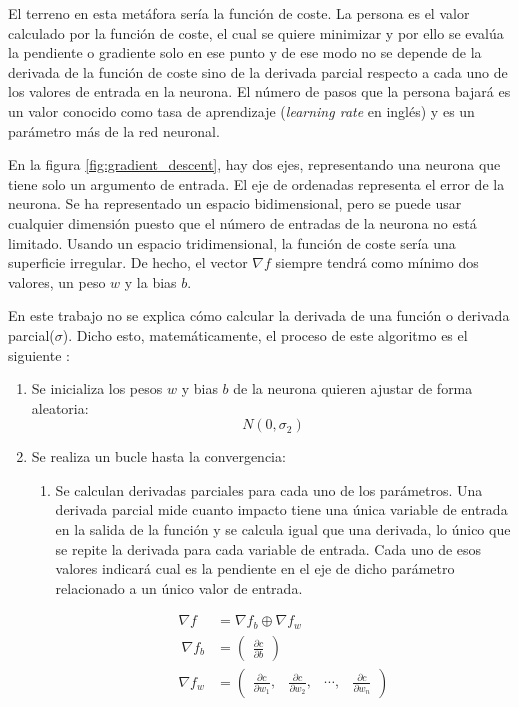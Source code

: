 \begin{itemize}
El terreno en esta metáfora sería la función de coste. La persona es el valor calculado por la función de coste, el cual se quiere minimizar y por ello se evalúa la pendiente o gradiente solo en ese punto y de ese modo no se depende de la derivada de la función de coste sino de la derivada parcial respecto a cada uno de los valores de entrada en la neurona. El número de pasos que la persona bajará es un valor conocido como tasa de aprendizaje (\textit{learning rate} en inglés) y es un parámetro más de la red neuronal. 
\newline


En la figura \ref{fig:gradient_descent}, hay dos ejes, representando una neurona que tiene solo un argumento de entrada. El eje de ordenadas representa el error de la neurona. Se ha representado un espacio bidimensional, pero se puede usar cualquier dimensión puesto que el número de entradas de la neurona no está limitado. Usando un espacio tridimensional, la función de coste sería una superficie irregular. De hecho, el vector $\nabla f$ siempre tendrá como mínimo dos valores, un peso $w$ y la bias $b$.
\newline

En este trabajo no se explica cómo calcular la derivada de una función o derivada parcial($\sigma$). Dicho esto, matemáticamente, el proceso de este algoritmo es el siguiente \cite{}:
\begin{enumerate}
\item Se inicializa los pesos $w$ y bias $b$ de la neurona quieren ajustar de forma aleatoria:
\begin{equation}
    ~N(0, \sigma_2)
\end{equation}

\item Se realiza un bucle hasta la convergencia:
\begin{enumerate}

\item Se calculan derivadas parciales para cada uno de los parámetros. Una derivada parcial mide cuanto impacto tiene una única variable de entrada en la salida de la función y se calcula igual que una derivada, lo único que se repite la derivada para cada variable de entrada. Cada uno de esos valores indicará cual es la pendiente en el eje de dicho parámetro relacionado a un único valor de entrada.

\begin{equation}
    \begin{split}
    \nabla f &= \nabla f_b \oplus \nabla f_w \\\
    \nabla f_b &= \begin{pmatrix} \frac{\partial c}{\partial b} \end{pmatrix}\\
    \nabla f_w &= \begin{pmatrix} \frac{\partial c}{\partial w_1}, & \frac{\partial c}{\partial w_2}, & \cdots , &  \frac{\partial c}{\partial w_n} \end{pmatrix}
  \end{split}
  \label{eqn:gradients}
\end{equation}



\end{enumerate}
\end{enumerate}
\end{itemize}
